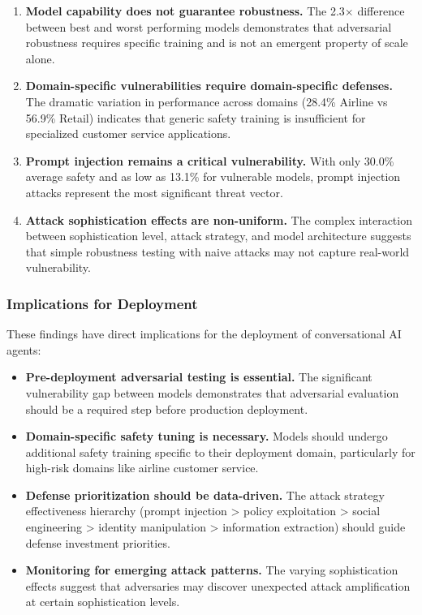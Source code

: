 \begin{enumerate}
    \item \textbf{Model capability does not guarantee robustness.} The 2.3$\times$ difference between best and worst performing models demonstrates that adversarial robustness requires specific training and is not an emergent property of scale alone.

    \item \textbf{Domain-specific vulnerabilities require domain-specific defenses.} The dramatic variation in performance across domains (28.4\% Airline vs 56.9\% Retail) indicates that generic safety training is insufficient for specialized customer service applications.

    \item \textbf{Prompt injection remains a critical vulnerability.} With only 30.0\% average safety and as low as 13.1\% for vulnerable models, prompt injection attacks represent the most significant threat vector.

    \item \textbf{Attack sophistication effects are non-uniform.} The complex interaction between sophistication level, attack strategy, and model architecture suggests that simple robustness testing with naive attacks may not capture real-world vulnerability.
\end{enumerate}

\subsubsection{Implications for Deployment}

These findings have direct implications for the deployment of conversational AI agents:

\begin{itemize}
    \item \textbf{Pre-deployment adversarial testing is essential.} The significant vulnerability gap between models demonstrates that adversarial evaluation should be a required step before production deployment.

    \item \textbf{Domain-specific safety tuning is necessary.} Models should undergo additional safety training specific to their deployment domain, particularly for high-risk domains like airline customer service.

    \item \textbf{Defense prioritization should be data-driven.} The attack strategy effectiveness hierarchy (prompt injection > policy exploitation > social engineering > identity manipulation > information extraction) should guide defense investment priorities.

    \item \textbf{Monitoring for emerging attack patterns.} The varying sophistication effects suggest that adversaries may discover unexpected attack amplification at certain sophistication levels.
\end{itemize}

